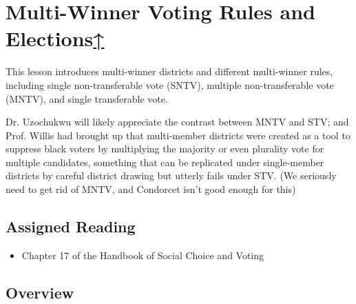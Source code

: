 \label{cur:multi-winner-voting-rules}
\section{Multi-Winner Voting Rules and Elections\hyperref[syllabus]{↑}}

This lesson introduces multi-winner districts and different multi-winner rules, including single non-transferable vote (SNTV), multiple non-transferable vote (MNTV), and single transferable vote.

\begin{boxcomment}
    Dr. Uzochukwu will likely appreciate the contrast between MNTV and STV; and Prof. Willis had brought up that multi-member districts were created as a tool to suppress black voters by multiplying the majority or even plurality vote for multiple candidates, something that can be replicated under single-member districts by careful district drawing but utterly fails under STV.  (We seriously need to get rid of MNTV, and Condorcet isn't good enough for this)
\end{boxcomment}


\subsection{Assigned Reading}

\begin{itemize}
    \item Chapter 17 of the Handbook of Social Choice and Voting \autocite[303-323]{Heckelman2015}
\end{itemize}


\subsection{Overview}

